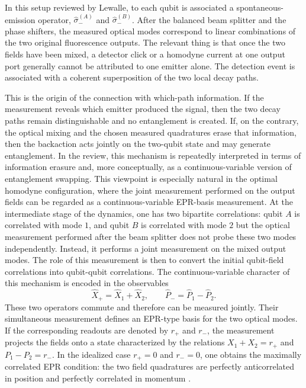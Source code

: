 In this setup reviewed by Lewalle, to each qubit is associated a spontaneous-emission operator, $\hat{\sigma}^{(A)}_-$ and $\hat{\sigma}^{(B)}_-$. After the balanced beam splitter and the phase shifters, the measured optical modes correspond to linear combinations of the two original fluorescence outputs. The relevant thing is that once the two fields have been mixed, a detector click or a homodyne current at one output port generally cannot be attributed to one emitter alone. The detection event is associated with a coherent superposition of the two local decay paths.

This is the origin of the connection with which-path information. If the measurement reveals which emitter produced the signal, then the two decay paths remain distinguishable and no entanglement is created. If, on the contrary, the optical mixing and the chosen measured quadratures erase that information, then the backaction acts jointly on the two-qubit state and may generate entanglement. In the review, this mechanism is repeatedly interpreted in terms of information erasure and, more conceptually, as a continuous-variable version of entanglement swapping. This viewpoint is especially natural in the optimal homodyne configuration, where the joint measurement performed on the output fields can be regarded as a continuous-variable EPR-basis measurement. At the intermediate stage of the dynamics, one has two bipartite correlations: qubit \(A\) is correlated with mode \(1\), and qubit \(B\) is correlated with mode \(2\) but the optical measurement performed after the beam splitter does not probe these two modes independently. Instead, it performs a joint measurement on the mixed output modes. The role of this measurement is then to convert the initial qubit-field correlations into qubit-qubit correlations.
The continuous-variable character of this mechanism is encoded in the observables
\begin{equation}
	\hat X_+ = \hat X_1 + \hat X_2,
	\qquad
	\hat P_- = \hat P_1 - \hat P_2.
	\label{eq:cv_epr_observables}
\end{equation}
These two operators commute and therefore can be measured jointly. Their simultaneous measurement defines an EPR-type basis for the two optical modes. If the corresponding readouts are denoted by \(r_+\) and \(r_-\), the measurement projects the fields onto a state characterized by the relations $X_1 + X_2 = r_+$ and $P_1 - P_2 = r_-$. In the idealized case \(r_+=0\) and \(r_-=0\), one obtains the maximally correlated EPR condition: the two field quadratures are perfectly anticorrelated in position and perfectly correlated in momentum \cite{Braunstein98}.

